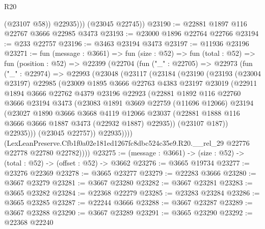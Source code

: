 \begin{lexlean}{R20}
\begin{coremodule}
              (@23107 @58))
            @22935)))
      (@23045 @22745))
@23190 := @22881 @1897 @116 @22767 @3666 @22985 @3473
@23193 := @23000 @1896 @22764 @22766
@23194 := @233 @22757
@23196 := @3463 @23194 @3473
@23197 := @11936 @23196
@23271 := fun (message : @3661) =>
  fun (size : @52) =>
  fun (total : @52) =>
  fun (position : @52) =>
  @22399
    (@22704
      (fun ("_" : @22705) =>
      @22973
        (fun ("_" : @22974) =>
        @22993
          (@23048
            (@23117
              (@23184
                (@23190
                  (@23193
                    (@23004 @23197)
                    @22985
                    (@23009
                      @1895
                      @3666
                      @22763
                      @4383
                      @23197
                      @23019
                      (@22911
                        @1894
                        @3666
                        @22762
                        @4379
                        @23196
                        @22923
                        (@22881
                          @1892
                          @116
                          @22760
                          @3666
                          @23194
                          @3473
                          (@23083
                            @1891
                            @3669
                            @22759
                            (@11696 @12066)
                            @23194
                            (@23027
                              @1890
                              @3666
                              @3668
                              @4119
                              @12066
                              @23037
                              (@22881 @1888 @116 @3666 @3666 @1887 @3473 (@22932 @1887) @22935))
                            (@23107 @187))
                          @22935)))
                    (@23045 @22757))
                  @22935))))
          (LexLeanPreserve.Cfb1f0a02e181ed1267fc8dbc524c35e9.R20.__rel_29
            @22776
            @22778
            @22780
            @22782))))
@23275 := (message : @3661) -> (size : @52) -> (total : @52) -> (offset : @52) -> @3662
@23276 := @3665 @19734
@23277 := @23276 @22369
@23278 := @3665 @23277
@23279 := @22283 @3666
@23280 := @3667 @23279
@23281 := @3667 @23280
@23282 := @3667 @23281
@23283 := @3665 @23282
@23284 := @22368 @22279
@23285 := @23283 @23284
@23286 := @3665 @23285
@23287 := @22244 @3666
@23288 := @3667 @23287
@23289 := @3667 @23288
@23290 := @3667 @23289
@23291 := @3665 @23290
@23292 := @22368 @22240

\end{coremodule}
\end{lexlean}
